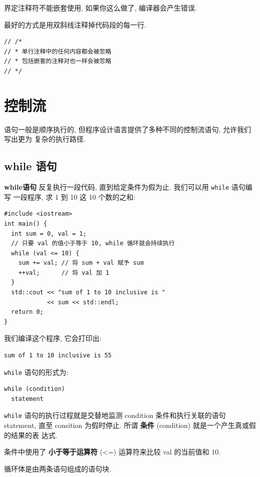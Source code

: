 \documentclass[lang=cn]{elegantbook}
\begin{document}
界定注释符不能嵌套使用, 如果你这么做了, 编译器会产生错误.

最好的方式是用双斜线注释掉代码段的每一行.

\begin{verbatim}
// /*
// * 单行注释中的任何内容都会被忽略
// * 包括嵌套的注释对也一样会被忽略
// */
\end{verbatim}

\section{控制流}
\label{sec:orgf215cd0}

语句一般是顺序执行的, 但程序设计语言提供了多种不同的控制流语句, 允许我们写出更为
复杂的执行路径.

\subsection{while 语句}
\label{sec:org7bcaaa8}

\textbf{while语句} 反复执行一段代码, 直到给定条件为假为止. 我们可以用 \texttt{while} 语句编写
一段程序, 求 1 到 10 这 10 个数的之和:

\begin{verbatim}
#include <iostream>
int main() {
  int sum = 0, val = 1;
  // 只要 val 的值小于等于 10, while 循环就会持续执行
  while (val <= 10) {
    sum += val; // 将 sum + val 赋予 sum
    ++val;      // 将 val 加 1
  }
  std::cout << "sum of 1 to 10 inclusive is "
            << sum << std::endl;
  return 0;
}
\end{verbatim}

我们编译这个程序, 它会打印出:

\begin{verbatim}
sum of 1 to 10 inclusive is 55
\end{verbatim}


\texttt{while} 语句的形式为:

\begin{verbatim}
while (condition)
  statement
\end{verbatim}

\texttt{while} 语句的执行过程就是交替地监测 condition 条件和执行关联的语句 statement,
直至 consition 为假时停止. 所谓 \textbf{条件} (condition) 就是一个产生真或假的结果的表
达式.

条件中使用了 \textbf{小于等于运算符} (<=) 运算符来比较 val 的当前值和 10.

循环体是由两条语句组成的语句块.
\end{document}
